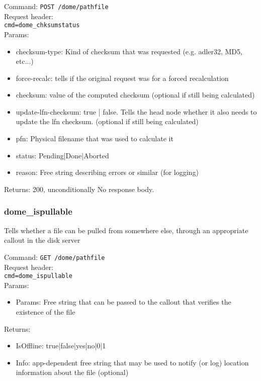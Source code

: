 \documentclass[a4paper,10pt]{scrreprt}
\begin{document}
Command:
\lstinline"POST /dome/pathfile"\\
Request header:\\
\lstinline"cmd=dome_chksumstatus"\\
Params:
\begin{itemize}
 \item checksum-type: Kind of checksum that was requested (e.g. adler32, MD5, etc...)
 \item force-recalc: tells if the original request was for a forced recalculation
 \item checksum: value of the computed checksum (optional if still being calculated)
 \item update-lfn-checksum: true | false. Tells the head node whether it also needs to update the lfn checksum. (optional if still being calculated)
 \item pfn: Physical filename that was used to calculate it
 \item status: Pending|Done|Aborted
 \item reason: Free string describing errors or similar (for logging)
\end{itemize}

Returns: 200, unconditionally
No response body.

\subsubsection{dome\_ispullable}
Tells whether a file can be pulled from somewhere else, through an appropriate callout in the disk server

Command:
\lstinline"GET /dome/pathfile"\\
Request header:\\
\lstinline"cmd=dome_ispullable"\\
Params:
\begin{itemize}
 \item Params: Free string that can be passed to the callout that verifies the existence of the file
\end{itemize}

Returns:
\begin{itemize}
 \item IsOffline: true|false|yes|no|0|1
 \item Info: app-dependent free string that may be used to notify (or log) location information about the file (optional)
\end{itemize}
\end{document}
